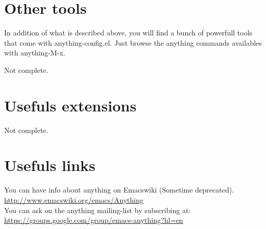 \documentclass[a4paper,11pt]{article}
\begin{document}
\section{Other tools}
\label{sec:other-tools}

In addition of what is described above, you will find a bunch of powerfull tools that come with anything-config.el.
Just browse the anything commands availables with anything-M-x.

Not complete.
\section{Usefuls extensions}
\label{sec:usefuls-extensions}
Not complete.

\section{Usefuls links}
\label{sec:usefuls-links}

You can have info about anything on Emacswiki (Sometime deprecated).\\
\url{http://www.emacswiki.org/emacs/Anything}\\

You can ask on the anything mailing-list by subscribing at:\\
\url{https://groups.google.com/group/emacs-anything?hl=en}
\end{document}
